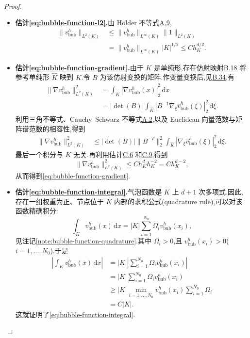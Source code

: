 \begin{proof}
\begin{itemize}
\item \textbf{估计\cref{eq:bubble-function-l2}.}由 Hölder 不等式\hyperref[eq:appendix-a-9]{A.9},
\begin{equation}\label{eq:bubble-function-l2-holder}
\begin{aligned}
  \|v_{\mathrm{bub}}^h\|_{L^2(K)}
  &\le \|v_{\mathrm{bub}}^h\|_{L^\infty(K)}\|1\|_{L^2(K)}\\
  &=\|v_{\mathrm{bub}}^h\|_{L^\infty(K)}|K|^{1/2}
    \le C h_K^{d/2}.
\end{aligned}
\end{equation}

\item \textbf{估计\cref{eq:bubble-function-gradient}.}由于 $K$ 是单纯形,存在仿射映射\hyperref[eq:appendix-b-18]{B.18} 将参考单纯形 $\widehat K$ 映到 $K$.令 $B$ 为该仿射变换的矩阵.作变量变换后,见\hyperref[eq:appendix-b-34]{B.34},有
\[
\begin{aligned}
  \|\nabla v_{\mathrm{bub}}^h\|_{L^2(K)}^2
  &=\int_K |\nabla v_{\mathrm{bub}}^h(x)|_2^2\,\mathrm{d}x\\
  &=|\det(B)|\int_{\widehat K}
       |B^{-T}\nabla_\xi\widehat v_{\mathrm{bub}}^h(\xi)|_2^2\,\mathrm{d}\xi.
\end{aligned}
\]
利用三角不等式、Cauchy--Schwarz 不等式\hyperref[eq:appendix-a-2]{A.2},以及 Euclidean 向量范数与矩阵谱范数的相容性,得到
\[
\begin{aligned}
  \|\nabla v_{\mathrm{bub}}^h\|_{L^2(K)}^2
  &\le |\det(B)|\|B^{-T}\|_2^2
       \int_{\widehat K}
       |\nabla_\xi\widehat v_{\mathrm{bub}}^h(\xi)|_2^2\,\mathrm{d}\xi.
\end{aligned}
\]
最后一个积分与 $K$ 无关.再利用估计\hyperref[eq:appendix-c-6]{C.6} 和\hyperref[eq:appendix-c-9]{C.9},得到
\[
  \|\nabla v_{\mathrm{bub}}^h\|_{L^2(K)}^2
  \le C h_K^d h_K^{-2}=C h_K^{d-2},
\]
从而得到\cref{eq:bubble-function-gradient}.

\item \textbf{估计\cref{eq:bubble-function-integral}.}气泡函数是 $K$ 上 $d+1$ 次多项式.因此,存在一组权重为正、节点位于 $K$ 内部的求积公式(quadrature rule),可以对该函数精确积分:
\[
  \int_K v_{\mathrm{bub}}^h(x)\,\mathrm{d}x
  =|K|\sum_{i=1}^{N_0}\Omega_i v_{\mathrm{bub}}^h(x_i),
\]
见注记\ref{note:bubble-function-quadrature}.其中 $\Omega_i>0$,且 $v_{\mathrm{bub}}^h(x_i)>0$($i=1,\ldots,N_0$).于是
\[
\begin{aligned}
  \left|\int_K v_{\mathrm{bub}}^h(x)\,\mathrm{d}x\right|
  &=|K|\left|\sum_{i=1}^{N_0}
       \Omega_i v_{\mathrm{bub}}^h(x_i)\right|\\
  &=|K|\sum_{i=1}^{N_0}\Omega_i v_{\mathrm{bub}}^h(x_i)\\
  &\ge |K|\min_{i=1,\ldots,N_0}v_{\mathrm{bub}}^h(x_i)
       \sum_{i=1}^{N_0}\Omega_i\\
  &=C|K|.
\end{aligned}
\]
这就证明了\cref{eq:bubble-function-integral}.
\end{itemize}
\end{proof}

